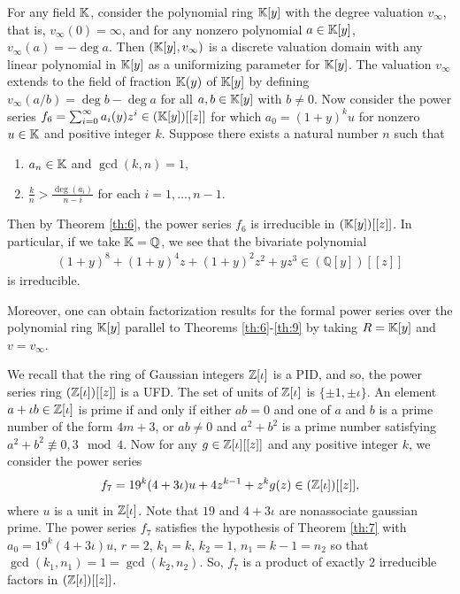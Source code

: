 \documentclass[12pt,reqno]{amsart}%
\begin{document}
\begin{example} For any field $\mathbb{K}$, consider the polynomial ring $\mathbb{K}[y]$ with the degree valuation $v_\infty$, that is, $v_\infty(0)=\infty$, and for any nonzero polynomial $a\in \mathbb{K}[y]$, $v_\infty(a)=-\deg a$. Then $(\mathbb{K}[y],v_\infty)$ is a discrete valuation domain with any linear polynomial in $\mathbb{K}[y]$ as a uniformizing parameter for $\mathbb{K}[y]$.  The valuation $v_\infty$  extends to the field of fraction $\mathbb{K}(y)$ of $\mathbb{K}[y]$ by defining $v_\infty(a/b)=\deg b-\deg a$ for all $a,b\in \mathbb{K}[y]$ with $b\neq 0$. Now consider the power series $f_6=\sum_{i=0}^\infty a_i(y)z^i\in (\mathbb{K}[y])[[z]]$ for which $a_0=(1+y)^ku$ for nonzero $u\in \mathbb{K}$ and positive integer $k$. Suppose there exists a natural  number $n$ such that
\begin{enumerate}
\item[(i)] $a_n\in \mathbb{K}$ and $\gcd(k,n)=1$,
\item[(ii)] $\frac{k}{n}>\frac{\deg(a_i)}{n-i}$ for each $i=1,\ldots,n-1$.
\end{enumerate}
Then by Theorem \ref{th:6}, the power series $f_6$ is irreducible in $(\mathbb{K}[y])[[z]]$. In particular, if we take $\mathbb{K}=\mathbb{Q}$, we see that the bivariate  polynomial
\begin{eqnarray*}
(1+y)^8+(1+y)^4z+(1+y)^2z^2+y z^3\in  (\mathbb{Q}[y])[[z]]
\end{eqnarray*}
is irreducible.

Moreover, one can obtain factorization results for the formal power series over the polynomial ring $\mathbb{K}[y]$ parallel to Theorems \ref{th:6}-\ref{th:9} by taking $R=\mathbb{K}[y]$ and $v=v_\infty$.
\end{example}
\begin{example} We recall that the ring of Gaussian integers $\Bbb{Z}[\iota]$ is a PID, and so, the power series ring  $(\Bbb{Z}[\iota])[[z]]$ is a UFD. The set of units of $\Bbb{Z}[\iota]$ is $\{\pm1,\pm \iota\}$. An element $a+\iota b \in \Bbb{Z}[\iota]$ is prime if and only if either $ab=0$ and one of $a$ and $b$ is a prime number of the form $4m+3$, or $ab\neq 0$ and $a^2+b^2$ is a prime number  satisfying $a^2+b^2\not\equiv 0,3 \mod 4$. Now for any $g\in  \Bbb{Z}[\iota][[z]]$ and any positive integer $k$, we consider the power series
\begin{eqnarray*}
f_{7}=19^k(4+3\iota)u+4z^{k-1}+z^k g(z)\in (\Bbb{Z}[\iota])[[z]],
\end{eqnarray*}
where $u$ is a unit in $\Bbb{Z}[\iota]$. Note that $19$ and $4+3\iota$  are nonassociate gaussian prime.
The power series $f_7$ satisfies the hypothesis of Theorem \ref{th:7} with $a_0=19^k(4+3\iota)u$, $r=2$, $k_1=k$, $k_2=1$, $n_1=k-1=n_2$  so that $\gcd(k_1,n_1)=1=\gcd(k_2,n_2)$. So, $f_{7}$ is a product of exactly $2$ irreducible factors in $(\Bbb{Z}[\iota])[[z]]$.
\end{example}
\end{document}
